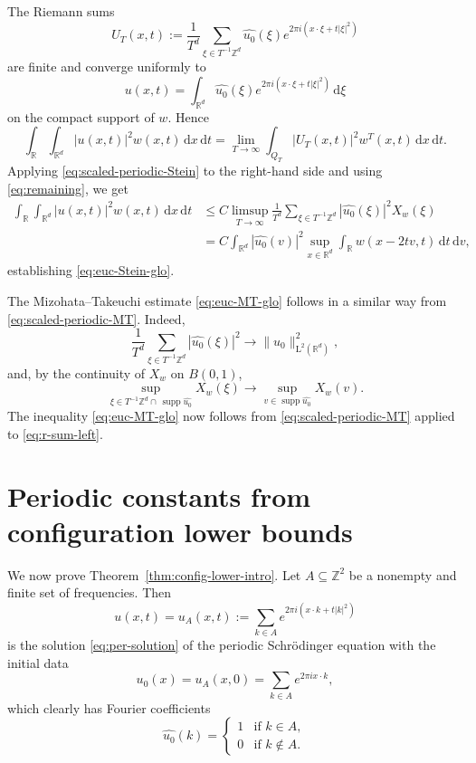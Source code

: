 \documentclass[10pt,a4paper]{amsart}
\numberwithin{equation}{section}
\newcommand{\supp}{\operatorname{supp}}
\newcommand{\dd}{\,\mathrm{d}}
\renewcommand{\leq}{\leqslant}
\begin{document}
The Riemann sums
\[ U_T(x,t):=\frac{1}{T^d}\sum_{\xi\in T^{-1}\mathbb{Z}^d}\widehat{u_0}(\xi)e^{2\pi i(x\cdot\xi+t|\xi|^2)} \]
are finite and converge uniformly to
\[ u(x,t)=\int_{\mathbb{R}^d}\widehat{u_0}(\xi)e^{2\pi i(x\cdot\xi+t|\xi|^2)}\dd\xi \]
on the compact support of $w$. Hence
\begin{equation}\label{eq:r-sum-left}
\int_{\mathbb{R}}\int_{\mathbb{R}^d}|u(x,t)|^2w(x,t)\dd x\dd t
=\lim_{T\to\infty}\int_{Q_T}|U_T(x,t)|^2w^T(x,t)\dd x\dd t.
\end{equation}
Applying \eqref{eq:scaled-periodic-Stein} to the right-hand side and using \eqref{eq:remaining}, we get
\begin{align*}
\int_{\mathbb{R}}\int_{\mathbb{R}^d}|u(x,t)|^2w(x,t)\dd x\dd t
&\leq C\limsup_{T\to\infty}\frac{1}{T^d}\sum_{\xi\in T^{-1}\mathbb{Z}^d}|\widehat{u_0}(\xi)|^2X_w(\xi)\\
&= C\int_{\mathbb{R}^d}|\widehat{u_0}(v)|^2\sup_{x\in\mathbb{R}^d}\int_{\mathbb{R}}w(x-2tv,t)\dd t\dd v,
\end{align*}
establishing \eqref{eq:euc-Stein-glo}.

The Mizohata--Takeuchi estimate \eqref{eq:euc-MT-glo} follows in a similar way from \eqref{eq:scaled-periodic-MT}. Indeed,
\[ \frac{1}{T^d}\sum_{\xi\in T^{-1}\mathbb{Z}^d}|\widehat{u_0}(\xi)|^2\longrightarrow \|u_0\|_{\mathrm{L}^2(\mathbb{R}^d)}^2, \]
and, by the continuity of $X_w$ on $B(0,1)$,
\[ \sup_{\xi\in T^{-1}\mathbb{Z}^d\cap\,\supp\widehat{u_0}}X_w(\xi)
\longrightarrow \sup_{v\in\supp\widehat{u_0}}X_w(v). \]
The inequality \eqref{eq:euc-MT-glo} now follows
from \eqref{eq:scaled-periodic-MT} applied to \eqref{eq:r-sum-left}.


\section{Periodic constants from configuration lower bounds}
\label{sec:config-lower}

We now prove Theorem~\ref{thm:config-lower-intro}. 
Let $A\subseteq\mathbb{Z}^2$ be a nonempty and finite set of frequencies.
Then
\[ u(x,t) = u_A(x,t) := \sum_{k\in A} e^{2\pi i(x\cdot k+t|k|^2)} \]
is the solution \eqref{eq:per-solution} of the periodic Schr\"{o}dinger equation with the initial data
\[ u_0(x) = u_A(x,0) = \sum_{k\in A} e^{2\pi i x\cdot k}, \]
which clearly has Fourier coefficients 
\[ \widehat{u_0}(k) = \begin{cases}
1 & \text{if } k\in A,\\
0 & \text{if } k\not\in A.
\end{cases} \]
\end{document}
